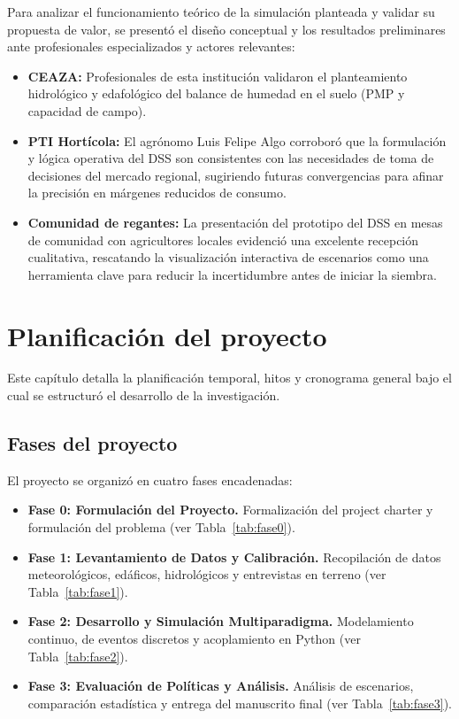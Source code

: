\documentclass[12pt]{report}
\begin{document}
Para analizar el funcionamiento teórico de la simulación planteada y validar su propuesta de valor, se presentó el diseño conceptual y los resultados preliminares ante profesionales especializados y actores relevantes:
\begin{itemize}
    \item \textbf{CEAZA:} Profesionales de esta institución validaron el planteamiento hidrológico y edafológico del balance de humedad en el suelo (PMP y capacidad de campo).
    \item \textbf{PTI Hortícola:} El agrónomo Luis Felipe Algo corroboró que la formulación y lógica operativa del DSS son consistentes con las necesidades de toma de decisiones del mercado regional, sugiriendo futuras convergencias para afinar la precisión en márgenes reducidos de consumo.
    \item \textbf{Comunidad de regantes:} La presentación del prototipo del DSS en mesas de comunidad con agricultores locales evidenció una excelente recepción cualitativa, rescatando la visualización interactiva de escenarios como una herramienta clave para reducir la incertidumbre antes de iniciar la siembra.
\end{itemize}

\chapter{Planificación del proyecto}

Este capítulo detalla la planificación temporal, hitos y cronograma general bajo el cual se estructuró el desarrollo de la investigación.

\section{Fases del proyecto}

El proyecto se organizó en cuatro fases encadenadas:
\begin{itemize}
    \item \textbf{Fase 0: Formulación del Proyecto.} Formalización del project charter y formulación del problema (ver Tabla~\ref{tab:fase0}).
    \item \textbf{Fase 1: Levantamiento de Datos y Calibración.} Recopilación de datos meteorológicos, edáficos, hidrológicos y entrevistas en terreno (ver Tabla~\ref{tab:fase1}).
    \item \textbf{Fase 2: Desarrollo y Simulación Multiparadigma.} Modelamiento continuo, de eventos discretos y acoplamiento en Python (ver Tabla~\ref{tab:fase2}).
    \item \textbf{Fase 3: Evaluación de Políticas y Análisis.} Análisis de escenarios, comparación estadística y entrega del manuscrito final (ver Tabla~\ref{tab:fase3}).
\end{itemize}
\end{document}
